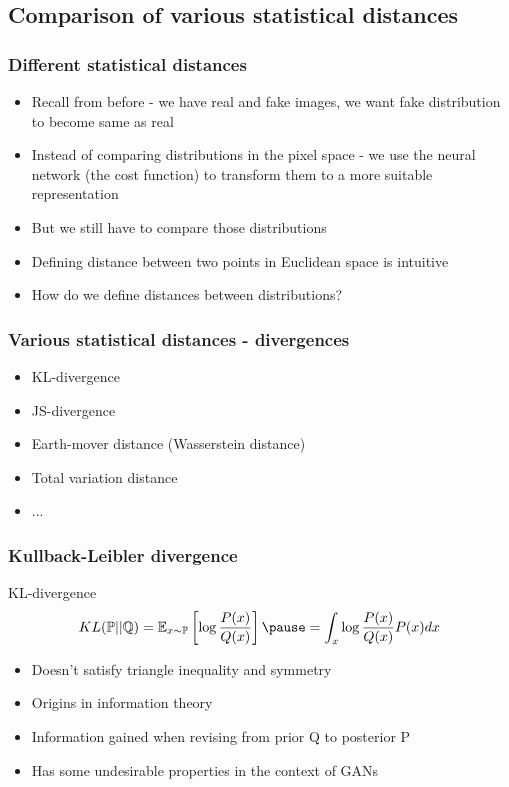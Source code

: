 \documentclass{Bredelebeamer}
\begin{document}
\subsection{Comparison of various statistical distances}
\begin{frame}
	\frametitle{Different statistical distances}
	\begin{itemize}
		\item Recall from before - we have real and fake images, we want fake distribution to become same as real
		\item Instead of comparing distributions in the pixel space - we use the neural network (the cost function) to transform them to a more suitable representation
		\item But we still have to compare those distributions
		\item Defining distance between two points in Euclidean space is intuitive
		\item How do we define distances between distributions?
	\end{itemize}
\end{frame}
\begin{frame}
	\frametitle{Various statistical distances - divergences}
	\begin{itemize}
		\item KL-divergence
		\item JS-divergence
		\item Earth-mover distance (Wasserstein distance)
		\item Total variation distance
		\item ...
	\end{itemize}
\end{frame}
\begin{frame}
	\frametitle{Kullback-Leibler divergence}
	\begin{exampleblock}{KL-divergence}
	\[
		KL(\mathbb{P} \vert \vert \mathbb{Q}) = \mathbb{E}_{x \sim \mathbb{P}} \left[ \log \frac{P(x)}{Q(x)} \right] \pause = \int_{x} \log \frac{P(x)}{Q(x)} P(x) dx
	\]
\end{exampleblock}
\pause
	\begin{itemize}
		\item Doesn't satisfy triangle inequality and symmetry
		\item Origins in information theory
		\item Information gained when revising from prior Q to posterior P
		\item Has some undesirable properties in the context of GANs
	\end{itemize}
\end{frame}
\end{document}
